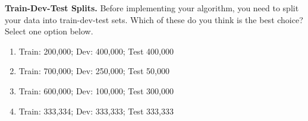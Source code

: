 \item {}
\textbf{Train-Dev-Test Splits.}
Before implementing your algorithm, you need to split your data into train-dev-test sets. Which of these do you think is the best choice? Select one option below.

\begin{enumerate}[label=(\alph*)]
    \item Train: 200,000; Dev: 400,000; Test 400,000
    \item Train: 700,000; Dev: 250,000; Test 50,000
    \item Train: 600,000; Dev: 100,000; Test 300,000
    \item Train: 333,334; Dev: 333,333; Test 333,333
\end{enumerate} 
